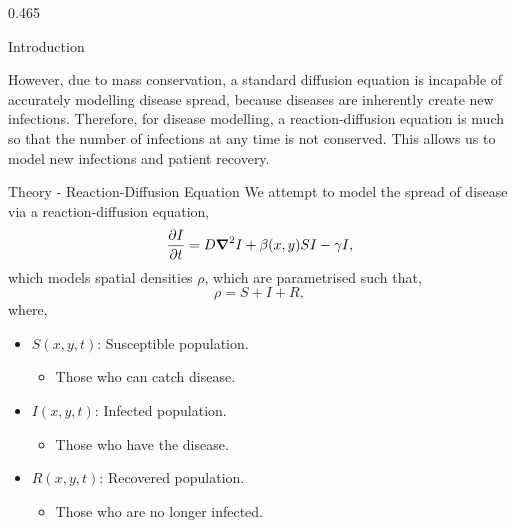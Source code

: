 \documentclass{beamer} %
\begin{document}
\begin{frame}[t]
\begin{columns}[t]
\begin{column}{0.465\textwidth}
\begin{block}{Introduction}
	\bigskip
	
	However, due to mass conservation, a standard diffusion equation is incapable of accurately modelling disease spread, because diseases are inherently create new infections. Therefore, for disease modelling, a reaction-diffusion equation is much so that the number of infections at any time is not conserved. This allows us to model new infections and patient recovery.
\end{block}


\begin{block}{Theory - Reaction-Diffusion Equation} 
	We attempt to model the spread of disease via a reaction-diffusion equation,
	\begin{equation}
		\pdv{I}{t} = D\grad^2I + \beta(x,y)SI 	- \gamma I,
	\end{equation}
	which models spatial densities $\rho$, which are parametrised such that,
	\begin{equation}
		\rho = S + I + R,
	\end{equation}
	where,
	\begin{itemize}
		\item $S(x,y,t)$: Susceptible population.
		\begin{itemize}
			\item Those who can catch disease.
		\end{itemize}
		\item $I(x,y,t)$: Infected population.
		\begin{itemize}
			\item Those who have the disease.
		\end{itemize}
		\item $R(x,y,t)$: Recovered population.
		\begin{itemize}
			\item Those who are no longer infected.
		\end{itemize}
	\end{itemize}
\end{block}


\end{column}
\end{columns}
\end{frame}
\end{document}
